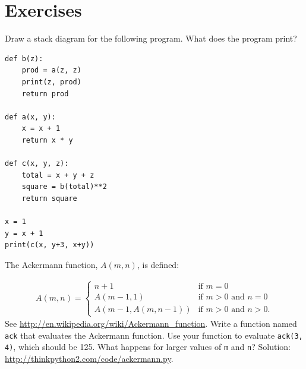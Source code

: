 \documentclass[10pt]{book}
\begin{document}
\section{Exercises}

\begin{exercise}

Draw a stack diagram for the following program.  What does the program print?

\begin{verbatim}
def b(z):
    prod = a(z, z)
    print(z, prod)
    return prod

def a(x, y):
    x = x + 1
    return x * y

def c(x, y, z):
    total = x + y + z
    square = b(total)**2
    return square

x = 1
y = x + 1
print(c(x, y+3, x+y))
\end{verbatim}

\end{exercise}


\begin{exercise}
\label{ackermann}

The Ackermann function, $A(m, n)$, is defined:

\begin{eqnarray*}
A(m, n) = \begin{cases} 
              n+1 & \mbox{if } m = 0 \\ 
        A(m-1, 1) & \mbox{if } m > 0 \mbox{ and } n = 0 \\ 
A(m-1, A(m, n-1)) & \mbox{if } m > 0 \mbox{ and } n > 0.
\end{cases} 
\end{eqnarray*}
%
See \url{http://en.wikipedia.org/wiki/Ackermann_function}.
Write a function named {\tt ack} that evaluates the Ackermann function.
Use your function to evaluate {\tt ack(3, 4)}, which should be 125.
What happens for larger values of {\tt m} and {\tt n}?
Solution: \url{http://thinkpython2.com/code/ackermann.py}.

\end{exercise}
\end{document}

